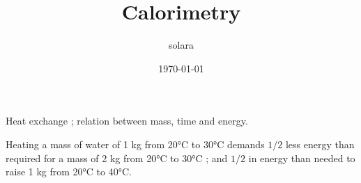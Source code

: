 \documentclass{article}
\title{Calorimetry}
\author{solara}
\date{\today}
\begin{document}
\maketitle

Heat exchange ; relation between mass, time and energy.

\vspace{1cm}
Heating a mass of water of 1 kg from 20°C to 30°C demands $1/2$ less energy than required for 
a mass of 2 kg from 20°C to 30°C ; and $1/2$ in energy than needed to raise 1 kg from 20°C to 40°C.
\end{document}
